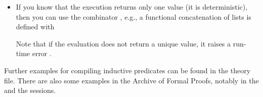 \begin{isabellebody}
\begin{isamarkuptext}
\begin{itemize}
    \item If you know that the execution returns only one value (it is
      deterministic), then you can use the combinator , e.g., a functional concatenation of lists is
      defined with

      \begin{quote}
      \end{quote}

      Note that if the evaluation does not return a unique value, it
      raises a run-time error .

  \end{itemize}%
\end{isamarkuptext}%
\isamarkuptrue%
%
\isamarkuptrue%
%
\begin{isamarkuptext}%
Further examples for compiling inductive predicates can be found in
  the  theory file.  There are
  also some examples in the Archive of Formal Proofs, notably in the
   and the 
  sessions.%
\end{isamarkuptext}%
\isamarkuptrue%
%
\isadelimtheory
%
\endisadelimtheory
%
\isatagtheory
{}\isamarkupfalse%
%
\endisatagtheory
{\isafoldtheory}%
%
\isadelimtheory
%
\endisadelimtheory
\isanewline
\isanewline
\end{isabellebody}%
